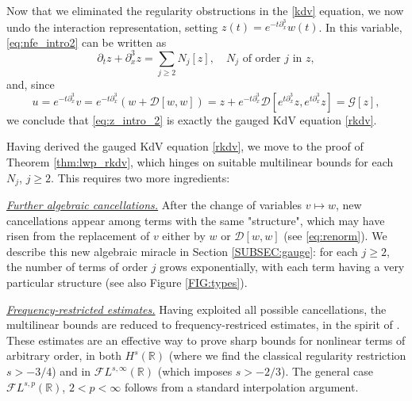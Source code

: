 \documentclass[%
11pt,  reqno]{amsart}
\newcommand{\5}{\textup{V}}
\newcommand{\noi}{\noindent}
\newcommand{\FL}{\mathcal{F} L}
\newcommand{\dx}{\partial_x}
\newcommand{\dt}{\partial_t}
\theoremstyle{remark}
\newcommand{\R}{\mathbb{R}}
\newcommand{\Gc}{\mathcal{G}}
\numberwithin{equation}{section}
\numberwithin{theorem}{section}
\newcommand{\DD}{\mathcal{D}}
\begin{document}
    Now that we eliminated the regularity obstructions in the \eqref{kdv} equation, we now undo the interaction representation, setting $z(t)=e^{-t\partial_x^3}w(t)$. In this variable, \eqref{eq:nfe_intro2} can be written as
    \begin{equation}\label{eq:z_intro_2}
\dt z + \dx^3 z = \sum_{j\ge 2} N_j[z],\quad N_j\mbox{ of order }j \mbox{ in }z,
    \end{equation}
    and, since
    \begin{equation}
u=e^{-t\dx^3}v= e^{-t\dx^3}\left(w+\DD[w,w]\right)= z + e^{-t\dx^3}\DD[e^{t\dx^3}z, e^{t\dx^3}z] = \Gc[z],
    \end{equation}
	we conclude that \eqref{eq:z_intro_2} is exactly the gauged KdV equation \eqref{rkdv}.
	
	\medskip
	
	
	
	
	
	Having derived the gauged KdV equation \eqref{rkdv}, we move to the proof of Theorem \ref{thm:lwp_rkdv}, which hinges on suitable multilinear bounds for each $N_j$, $j\ge 2$. This requires two more ingredients:

    \smallskip
    \noi\textit{\underline{Further algebraic cancellations.}} After the change of variables $v\mapsto w$, new cancellations appear among terms with the same "structure", which may have risen from the replacement of $v$ either by $w$ or $\mathcal{D}[w,w]$ (see \eqref{eq:renorm}). We describe this new algebraic miracle in Section \ref{SUBSEC:gauge}:  for each $j\ge 2$, the number of terms of order $j$ grows exponentially, with each term having a very particular structure (see also Figure \ref{FIG:types}).
    
    \smallskip
    \noi\textit{\underline{Frequency-restricted estimates.}} Having exploited all possible cancellations, the multilinear bounds are reduced to frequency-restriced estimates, in the spirit of \cite{CC24, CLS, COS}. These estimates are an effective way to prove sharp bounds for nonlinear terms of arbitrary order, in both $H^s(\R)$ (where we find the classical regularity restriction $s>-3/4$) and in $\FL^{s,\infty}(\R)$ (which imposes $s>-2/3$). The general case $\FL^{s,p}(\R)$, $2<p<\infty$ follows from a standard interpolation argument.
	
\end{document}

